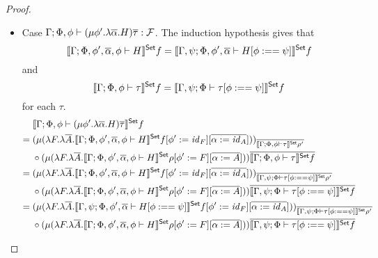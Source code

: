 \documentclass[acmsmall,review,anonymous]{acmart}
\theoremstyle{definition}
\newcommand{\F}{\mathcal{F}}
\newcommand{\set}{\mathsf{Set}}
\renewcommand{\id}{\mathit{id}}
\begin{document}
\begin{proof}
\begin{itemize}
  \item Case $\Gamma; \Phi, \phi \vdash (\mu \phi'. \lambda \ol\alpha. H)\ol\tau : \F$. 
      The induction hypothesis gives that 
      $$\setsem{\Gamma; \Phi, \phi', \ol{\alpha}, \phi \vdash H } f
        = \setsem{\Gamma, \psi; \Phi, \phi', \ol{\alpha} \vdash H[\phi :== \psi] } f$$ 
      and 
      $$\setsem{\Gamma; \Phi, \phi \vdash \tau } f
        = \setsem{\Gamma, \psi; \Phi \vdash \tau[\phi :== \psi] } f$$ 
      for each $\tau$. 
      \begin{align*}
        & \setsem{\Gamma; \Phi, \phi \vdash (\mu \phi'. \lambda \ol\alpha. H)\ol\tau } f \\
        = \; & 
           (\mu (
             \lambda F. \lambda \ol{A}. \setsem{\Gamma; \Phi, \phi', \ol{\alpha}, \phi \vdash H} f [\phi' := \id_F][\ol{\alpha := \id_A}]
           ))_{\ol{\setsem{\Gamma; \Phi, \phi \vdash \tau} \rho'}} \\
          \; & \circ
          (\mu (
            \lambda F. \lambda \ol{A}. \setsem{\Gamma; \Phi, \phi', \ol{\alpha}, \phi \vdash H} \rho[\phi' := F][\ol{\alpha := A}]
          )
        ) \ol{\setsem{ \Gamma; \Phi, \phi \vdash \tau} f} \\
        = \; & 
           (\mu (
             \lambda F. \lambda \ol{A}. \setsem{\Gamma; \Phi, \phi', \ol{\alpha}, \phi \vdash H} f [\phi' := \id_F][\ol{\alpha := \id_A}]
           ))_{\ol{\setsem{\Gamma, \psi; \Phi \vdash \tau[\phi :== \psi]} \rho'}} \\
          \; & \circ
          (\mu (
            \lambda F. \lambda \ol{A}. \setsem{\Gamma; \Phi, \phi', \ol{\alpha}, \phi \vdash H} \rho[\phi' := F][\ol{\alpha := A}]
          )
        ) \ol{\setsem{ \Gamma, \psi; \Phi \vdash \tau[\phi :== \psi]} f} \\
        = \; & 
           (\mu (
              \lambda F. \lambda \ol{A}. \setsem{\Gamma, \psi; \Phi, \phi', \ol{\alpha} \vdash H[\phi :== \psi]} f [\phi' := \id_F][\ol{\alpha := \id_A}]
           ))_{\ol{\setsem{\Gamma, \psi; \Phi \vdash \tau[\phi :== \psi]} \rho'}} \\
          \; & \circ
          (\mu (
            \lambda F. \lambda \ol{A}. \setsem{\Gamma; \Phi, \phi', \ol{\alpha}, \phi \vdash H} \rho[\phi' := F][\ol{\alpha := A}]
          )
        ) \ol{\setsem{ \Gamma, \psi; \Phi \vdash \tau[\phi :== \psi]} f} \\

\end{align*}
\end{itemize}
\end{proof}
\end{document}

